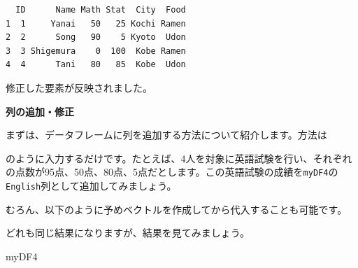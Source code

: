 \documentclass[
  a4paper,
  pandoc,
  ja=standard,
  jafont=haranoaji]{bxjsbook}
\newenvironment{Shaded}{\begin{snugshade}}{\end{snugshade}}
\newcommand{\DecValTok}[1]{\textcolor[rgb]{0.68,0.00,0.00}{#1}}
\newcommand{\FunctionTok}[1]{\textcolor[rgb]{0.28,0.35,0.67}{#1}}
\newcommand{\NormalTok}[1]{\textcolor[rgb]{0.00,0.48,0.65}{#1}}
\newcommand{\OtherTok}[1]{\textcolor[rgb]{0.00,0.48,0.65}{#1}}
\newcommand{\SpecialCharTok}[1]{\textcolor[rgb]{0.37,0.37,0.37}{#1}}
\begin{document}
\begin{verbatim}
  ID      Name Math Stat  City  Food
1  1     Yanai   50   25 Kochi Ramen
2  2      Song   90    5 Kyoto  Udon
3  3 Shigemura    0  100  Kobe Ramen
4  4      Tani   80   85  Kobe  Udon
\end{verbatim}

修正した要素が反映されました。

\textbf{列の追加・修正}

まずは、データフレームに列を追加する方法について紹介します。方法は

\begin{Shaded}
\end{Shaded}

のように入力するだけです。たとえば、4人を対象に英語試験を行い、それぞれの点数が95点、50点、80点、5点だとします。この英語試験の成績を\texttt{myDF4}の\texttt{English}列として追加してみましょう。

\begin{Shaded}
\end{Shaded}

むろん、以下のように予めベクトルを作成してから代入することも可能です。

\begin{Shaded}
\end{Shaded}

どれも同じ結果になりますが、結果を見てみましょう。

\begin{Shaded}
\begin{Highlighting}[numbers=left,,]
\NormalTok{myDF4}
\end{Highlighting}
\end{Shaded}
\end{document}

